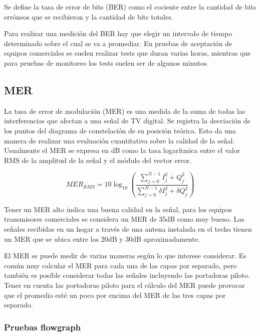 Se define la tasa de error de bits (BER) como el cociente entre la cantidad de bits erróneos que se recibieron y la cantidad de bits totales.

Para realizar una medición del BER hay que elegir un intervalo de tiempo determinado sobre el cual se va a promediar. En pruebas de aceptación de equipos comerciales se suelen realizar tests que duran varias horas, mientras que para pruebas de monitoreo los tests suelen ser de algunos minutos.





 

\subsection{MER}
La tasa de error de modulación (MER) es una medida de la suma de todas las interferencias que afectan a una señal de TV digital. Se registra la desviación de los puntos del diagrama de constelación de su posición teórica. Esto da una manera de realizar una evaluación cuantitativa sobre la calidad de la señal. Usualmente el MER se expresa en dB como la tasa logarítmica entre el valor RMS de la amplitud de la señal y el módulo del vector error.


\begin{equation}
MER_{RMS} = 10 \log_{10} \left( \dfrac{\sum_{j = 0}^{N-1} I_{j}^{2}+ Q_{j}^{2}}{\sum_{j = 0}^{N-1}\delta I_{j}^{2}+\delta Q_{j}^{2}} \right )
\end{equation}


Tener un MER alto indica una buena calidad en la señal, para los equipos transmisores comerciales se considera un MER de 35dB como muy bueno. Las señales recibidas en un hogar a través de una antena instalada en el techo tienen un MER que se ubica entre los 20dB y 30dB aproximadamente. 

El MER se puede medir de varias maneras según lo que interese considerar. Es común muy calcular el MER para cada una de las capas por separado, pero también es posible considerar todas las señales incluyendo las portadoras piloto. Tener en cuenta las portadoras piloto para el cálculo del MER puede provocar que el promedio esté un poco por encima del MER de las tres capas por separado.



\subsubsection{Pruebas flowgraph}

